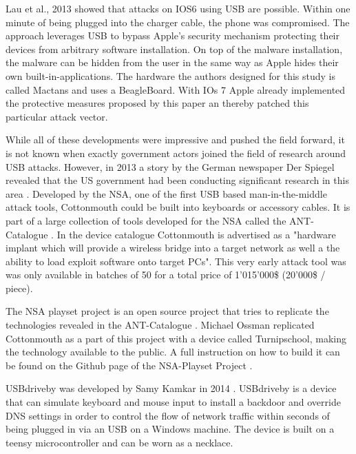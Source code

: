 Lau et al., 2013 \cite{lauMactansInjectingMalware2013} showed that attacks on IOS6 using USB are possible. Within one minute of being plugged into the charger cable, the phone was compromised. The approach leverages USB to bypass Apple's security mechanism protecting their devices from arbitrary software installation. On top of the malware installation, the malware can be hidden from the user in the same way as Apple hides their own built-in-applications. 
The hardware the authors designed for this study is called Mactans and uses a BeagleBoard. With IOs 7 Apple already implemented the protective measures proposed by this paper an thereby patched this particular attack vector. 

While all of these developments were impressive and pushed the field forward, it is not known when exactly government actors joined the field of research around USB attacks. However, in 2013 a story by the German newspaper Der Spiegel revealed that the US government had been conducting significant research in this area \cite{appelbaumCatalogRevealsNSA2013}. Developed by the NSA, one of the first USB based man-in-the-middle attack tools, Cottonmouth could be built into keyboards or accessory cables. It is part of a large collection of tools developed for the NSA called the ANT-Catalogue \cite{InteractiveGraphicNSA}. In the device catalogue Cottonmouth is advertised as a "hardware implant which will provide a wireless bridge into a target network as well a the ability to load exploit software onto target PCs". This very early attack tool was was only available in batches of 50 for a total price of 1'015'000\$ (20'000\$ / piece).

The NSA playset project is an open source project that tries to replicate the technologies revealed in the ANT-Catalogue \cite{NSAPlaysetTurnipschoolHtml}. Michael Ossman replicated Cottonmouth as a part of this  project with a device called Turnipschool, making the technology available to the public. A full instruction on how to build it can be found on the Github page of the NSA-Playset Project \cite{NSAPlaysetTurnipschoolHtml}. 

USBdriveby was developed by Samy Kamkar in 2014 \cite{SamyKamkarUSBdriveby}. USBdriveby is a device that can simulate keyboard and mouse input to install a backdoor and override DNS settings in order to control the flow of network traffic within seconds of being plugged in via an USB on a Windows machine. The device is built on a teensy microcontroller and can be worn as a necklace.

